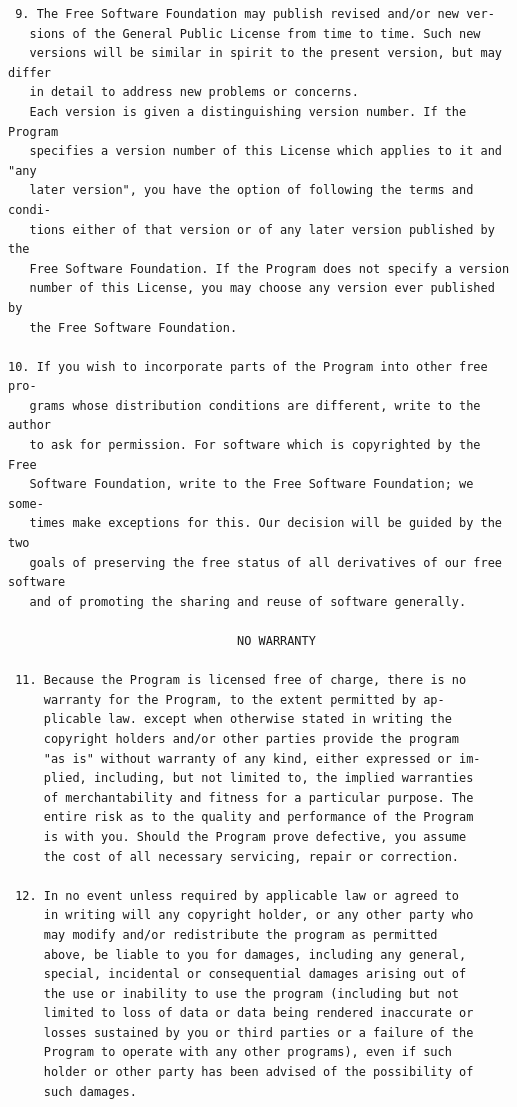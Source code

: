 \documentclass[11pt]{report}
\begin{document}
\begin{appendix}
\begin{verbatim}
 9. The Free Software Foundation may publish revised and/or new ver-
   sions of the General Public License from time to time. Such new
   versions will be similar in spirit to the present version, but may differ
   in detail to address new problems or concerns.
   Each version is given a distinguishing version number. If the Program
   specifies a version number of this License which applies to it and "any
   later version", you have the option of following the terms and condi-
   tions either of that version or of any later version published by the
   Free Software Foundation. If the Program does not specify a version
   number of this License, you may choose any version ever published by
   the Free Software Foundation.

10. If you wish to incorporate parts of the Program into other free pro-
   grams whose distribution conditions are different, write to the author
   to ask for permission. For software which is copyrighted by the Free
   Software Foundation, write to the Free Software Foundation; we some-
   times make exceptions for this. Our decision will be guided by the two
   goals of preserving the free status of all derivatives of our free software
   and of promoting the sharing and reuse of software generally.

                                NO WARRANTY

 11. Because the Program is licensed free of charge, there is no
     warranty for the Program, to the extent permitted by ap-
     plicable law. except when otherwise stated in writing the
     copyright holders and/or other parties provide the program
     "as is" without warranty of any kind, either expressed or im-
     plied, including, but not limited to, the implied warranties
     of merchantability and fitness for a particular purpose. The
     entire risk as to the quality and performance of the Program
     is with you. Should the Program prove defective, you assume
     the cost of all necessary servicing, repair or correction.

 12. In no event unless required by applicable law or agreed to
     in writing will any copyright holder, or any other party who
     may modify and/or redistribute the program as permitted
     above, be liable to you for damages, including any general,
     special, incidental or consequential damages arising out of
     the use or inability to use the program (including but not
     limited to loss of data or data being rendered inaccurate or
     losses sustained by you or third parties or a failure of the
     Program to operate with any other programs), even if such
     holder or other party has been advised of the possibility of
     such damages.


\end{verbatim}
\end{appendix}
\end{document}
